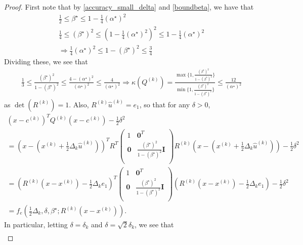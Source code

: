 \documentclass{article}
\theoremstyle{case}
\newcommand{\bs}{{\beta^{\star}}}
\newcommand{\ck}{{c^{(k)}}}
\newcommand{\dk}{\Delta_k}
\newcommand{\huk}{{{\hat u}^{(k)}}}
\newcommand{\minanglealpha}{{ \alpha^{\star} }}
\newcommand{\qk}{{Q^{(k)}}}
\newcommand{\rotk}{{R^{(k)}}}
\newcommand{\sdk}{{\delta_k}}
\newcommand{\xk}{{x^{(k)}}}
\begin{document}
\begin{proof}
First note that by \cref{accuracy_small_delta} and \cref{boundbeta}, we have that
\begin{align*}
\frac {1} 2 \le \bs \le 1 - \frac 1 4 \left(\minanglealpha\right)^2 \\
\frac {1} 4 \le \left(\bs\right)^2 \le \left(1 - \frac 1 4 \left(\minanglealpha\right)^2\right)^2 \le 1 - \frac 1 4 \left(\minanglealpha\right)^2 \\
\Longrightarrow 
\frac 1 4 \left(\minanglealpha\right)^2 \le 1 - \left(\bs\right)^2 \le \frac 3 4
\end{align*}
Dividing these, we see that
\begin{align*}
\frac 1 3
\le \frac{\left(\bs\right)^2}{1 - \left(\bs\right)^2}
\le \frac {4 - \left(\minanglealpha\right)^2}{\left(\minanglealpha\right)^2} \le \frac {4}{\left(\minanglealpha\right)^2}
\Longrightarrow 
\kappa(\qk) 
= \frac{\max\{1, \frac{\left(\bs\right)^2}{1 - \left(\bs\right)^2}\}}{\min\{1, \frac{\left(\bs\right)^2}{1 - \left(\bs\right)^2}\}} 
\le \frac {12}{\left(\minanglealpha\right)^2}
\end{align*}
as $\det(\rotk) = 1$.
Also, $\rotk\huk = e_1$, so that for any $\delta > 0$,
\begin{align*}
\left(x - \ck\right)^T\qk\left(x - \ck\right) - \frac 1 2 \delta^2 \\
= \left(x - \left(\xk + \frac 1 2 \dk \huk\right)\right)^TR^T\begin{pmatrix}
1 & \boldsymbol0^T \\
\boldsymbol 0 & \frac{\left(\bs\right)^2}{1 - \left(\bs\right)^2} \boldsymbol I \\
\end{pmatrix} \rotk\left(x - \left(\xk + \frac 1 2 \dk \huk\right)\right) - \frac 1 2 \delta^2 \\
= \left(\rotk(x-\xk) - \frac 1 2 \dk e_1\right)^T\begin{pmatrix}
1 & \boldsymbol0^T \\
\boldsymbol 0 & \frac{\left(\bs\right)^2}{1 - \left(\bs\right)^2} \boldsymbol I \\
\end{pmatrix} \left(\rotk(x-\xk) - \frac 1 2 \dk e_1\right) - \frac 1 2 \delta^2 \\
= f_e\left(\frac 1 2 \dk, \delta, \bs; \rotk\left(x - \xk\right)\right).
\end{align*}
In particular, letting $\delta = \sdk$ and $\delta = \sqrt{2}\sdk$, we see that
\begin{align*}

\end{align*}
\end{proof}
\end{document}
